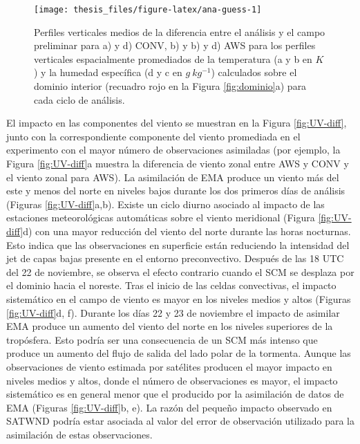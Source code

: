 \documentclass[12pt,oneside,a4paper]{reedthesis}
\begin{document}
\begin{figure}

{\centering \texttt{[image: thesis\_files/figure-latex/ana-guess-1]} 

}

\caption{Perfiles verticales medios de la diferencia entre el análisis y el campo preliminar para a) y d) CONV, b) y b) y d) AWS para los perfiles verticales espacialmente promediados de la temperatura (a y b en \(K\)) y la humedad específica (d y c en \(g\ kg^{-1}\)) calculados sobre el dominio interior (recuadro rojo en la Figura \ref{fig:dominio}a) para cada ciclo de análisis.}\label{fig:ana-guess}
\end{figure}
El impacto en las componentes del viento se muestran en la Figura \ref{fig:UV-diff}, junto con la correspondiente componente del viento promediada en el experimento con el mayor número de observaciones asimiladas (por ejemplo, la Figura \ref{fig:UV-diff}a muestra la diferencia de viento zonal entre AWS y CONV y el viento zonal para AWS). La asimilación de EMA produce un viento más del este y menos del norte en niveles bajos durante los dos primeros días de análisis (Figuras \ref{fig:UV-diff}a,b). Existe un ciclo diurno asociado al impacto de las estaciones meteorológicas automáticas sobre el viento meridional (Figura \ref{fig:UV-diff}d) con una mayor reducción del viento del norte durante las horas nocturnas. Esto indica que las observaciones en superficie están reduciendo la intensidad del jet de capas bajas presente en el entorno preconvectivo. Después de las 18 UTC del 22 de noviembre, se observa el efecto contrario cuando el SCM se desplaza por el dominio hacia el noreste. Tras el inicio de las celdas convectivas, el impacto sistemático en el campo de viento es mayor en los niveles medios y altos (Figuras \ref{fig:UV-diff}d, f). Durante los días 22 y 23 de noviembre el impacto de asimilar EMA produce un aumento del viento del norte en los niveles superiores de la tropósfera. Esto podría ser una consecuencia de un SCM más intenso que produce un aumento del flujo de salida del lado polar de la tormenta. Aunque las observaciones de viento estimada por satélites producen el mayor impacto en niveles medios y altos, donde el número de observaciones es mayor, el impacto sistemático es en general menor que el producido por la asimilación de datos de EMA (Figuras \ref{fig:UV-diff}b, e). La razón del pequeño impacto observado en SATWND podría estar asociada al valor del error de observación utilizado para la asimilación de estas observaciones.
\end{document}

